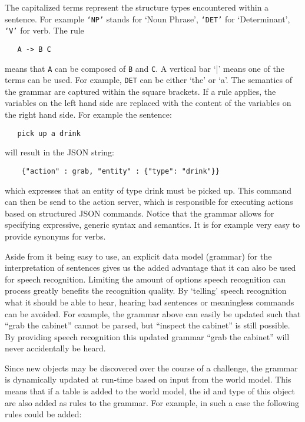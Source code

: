 The capitalized terms represent the structure types encountered within a sentence. For example \texttt{`NP'} stands for `Noun Phrase', \texttt{`DET'} for `Determinant', \texttt{`V'} for verb. The rule

\begin{lstlisting}
   A -> B C
\end{lstlisting}   

means that \texttt{A} can be composed of \texttt{B} and \texttt{C}. A vertical bar `|' means one of the terms can be used. For example, \texttt{DET} can be either `the' or `a'. The semantics of the grammar are captured within the square brackets. If a rule applies, the variables on the left hand side are replaced with the content of the variables on the right hand side. For example the sentence:

\begin{lstlisting}
   pick up a drink
\end{lstlisting}

will result in the JSON string:

\begin{lstlisting}
    {"action" : grab, "entity" : {"type": "drink"}}
\end{lstlisting}

which expresses that an entity of type drink must be picked up. This command can then be send to the action server, which is responsible for executing actions based on structured JSON commands. Notice that the grammar allows for specifying expressive, generic syntax and semantics. It is for example very easy to provide synonyms for verbs.

Aside from it being easy to use, an explicit data model (grammar) for the interpretation of sentences gives us the added advantage that it can also be used for speech recognition. Limiting the amount of options speech recognition can process greatly benefits the recognition quality. By `telling' speech recognition what it should be able to hear, hearing bad sentences or meaningless commands can be avoided. For example, the grammar above can easily be updated such that ``grab the cabinet'' cannot be parsed, but ``inspect the cabinet'' is still possible. By providing speech recognition this updated grammar ``grab the cabinet'' will never accidentally be heard.

Since new objects may be discovered over the course of a challenge, the grammar is dynamically updated at run-time based on input from the world model. This means that if a table is added to the world model, the id and type of this object are also added as rules to the grammar. For example, in such a case the following rules could be added:

